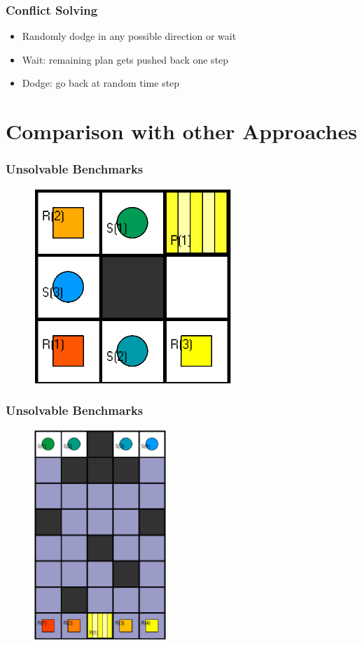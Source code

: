 \documentclass{beamer}
\begin{document}
\begin{frame}
\frametitle{Conflict Solving}
\begin{itemize}
\item<2-> Randomly dodge in any possible direction or wait
\bigskip
\item<3-> Wait: remaining plan gets pushed back one step 
\bigskip
\item<4-> Dodge: go back at random time step  
\end{itemize}
\end{frame}

\section{Comparison with other Approaches}
\begin{frame}
\frametitle{Unsolvable Benchmarks}
\begin{figure}
\includegraphics[width=75mm]{Images/Instance 1}
\end{figure}
\end{frame}

\begin{frame}
\frametitle{Unsolvable Benchmarks}
\begin{figure}
\includegraphics[width=50mm]{Images/Instance 2}
\end{figure}
\end{frame}
\end{document}
